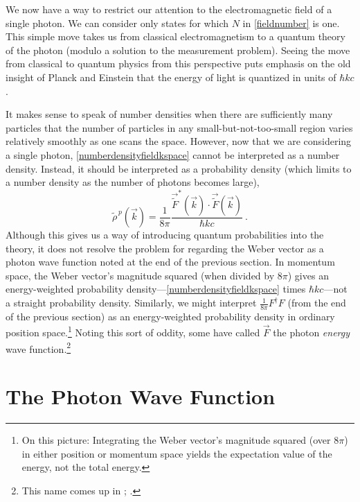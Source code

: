 \documentclass[12pt,secnumarabic,amsmath,amssymb,balancelastpage,nofootinbib]{article}
\begin{document}
We now have a way to restrict our attention to the electromagnetic field of a single photon.  We can consider only states for which $N$ in \eqref{fieldnumber} is one.  This simple move takes us from classical electromagnetism to a quantum theory of the photon (modulo a solution to the measurement problem).  Seeing the move from classical to quantum physics from this perspective puts emphasis on the old insight of Planck and Einstein that the energy of light is quantized in units of $\hbar k c$.

It makes sense to speak of number densities when there are sufficiently many particles that the number of particles in any small-but-not-too-small region varies relatively smoothly as one scans the space.  However, now that we are considering a single photon, \eqref{numberdensityfieldkspace} cannot be interpreted as a number density.  Instead, it should be interpreted as a probability density (which limits to a number density as the number of photons becomes large),
\begin{equation}
\widetilde{\rho}^{\,p}(\vec{k})=\frac{1}{8 \pi}\frac{\vec{\widetilde{F}}^*\!\!(\vec{k})\cdot\vec{\widetilde{F}}(\vec{k})}{\hbar k c}
\ .
\label{probdensityfieldkspace}
\end{equation}
Although this gives us a way of introducing quantum probabilities into the theory, it does not resolve the problem for regarding the Weber vector as a photon wave function noted at the end of the previous section.  In momentum space, the Weber vector's magnitude squared (when divided by $8 \pi$) gives an energy-weighted probability density---\eqref{numberdensityfieldkspace} times $\hbar k c$---not a straight probability density.  Similarly, we might interpret $\frac{1}{8 \pi}F^{\dagger}F$ (from the end of the previous section) as an energy-weighted probability density in ordinary position space.\footnote{On this picture: Integrating the Weber vector's magnitude squared (over $8 \pi$) in either position or momentum space yields the expectation value of the energy, not the total energy.}  Noting this sort of oddity, some have called $\vec{F}$ the photon \emph{energy} wave function.\footnote{This name comes up in \citet[sec.\ 12.11.5]{mandelwolf}; \citet{bb1996, keller2005}.}
  


\section{The Photon Wave Function}\label{PWFsection}
\end{document}
